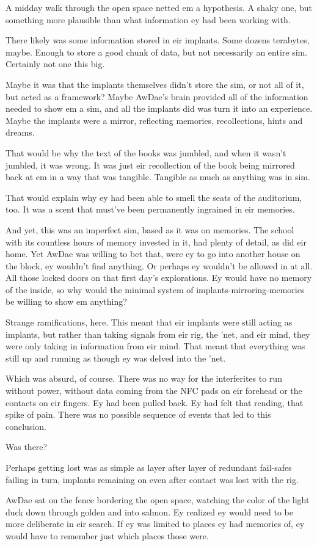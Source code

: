 A midday walk through the open space netted em a hypothesis. A shaky one, but something more plausible than what information ey had been working with.

There likely was some information stored in eir implants. Some dozens terabytes, maybe. Enough to store a good chunk of data, but not necessarily an entire sim. Certainly not one this big.

Maybe it was that the implants themselves didn't store the sim, or not all of it, but acted as a framework? Maybe AwDae's brain provided all of the information needed to show em a sim, and all the implants did was turn it into an experience. Maybe the implants were a mirror, reflecting memories, recollections, hints and dreams.

That would be why the text of the books was jumbled, and when it wasn't jumbled, it was wrong. It was just eir recollection of the book being mirrored back at em in a way that was tangible. Tangible as much as anything was in sim.

That would explain why ey had been able to smell the seats of the auditorium, too. It was a scent that must've been permanently ingrained in eir memories.

And yet, this was an imperfect sim, based as it was on memories. The school with its countless hours of memory invested in it, had plenty of detail, as did eir home. Yet AwDae was willing to bet that, were ey to go into another house on the block, ey wouldn't find anything. Or perhaps ey wouldn't be allowed in at all. All those locked doors on that first day's explorations. Ey would have no memory of the inside, so why would the minimal system of implants-mirroring-memories be willing to show em anything?

Strange ramifications, here. This meant that eir implants were still acting as implants, but rather than taking signals from eir rig, the 'net, and eir mind, they were only taking in information from eir mind. That meant that everything was still up and running as though ey was delved into the 'net.

Which was absurd, of course. There was no way for the interferites to run without power, without data coming from the NFC pads on eir forehead or the contacts on eir fingers. Ey had been pulled back. Ey had felt that rending, that spike of pain. There was no possible sequence of events that led to this conclusion.

Was there?

Perhaps getting lost was as simple as layer after layer of redundant fail-safes failing in turn, implants remaining on even after contact was lost with the rig.

AwDae sat on the fence bordering the open space, watching the color of the light duck down through golden and into salmon. Ey realized ey would need to be more deliberate in eir search. If ey was limited to places ey had memories of, ey would have to remember just which places those were.
